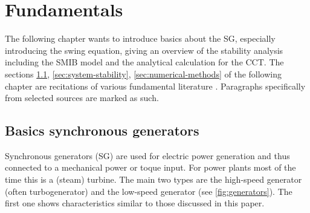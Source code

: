 
\chapter{Fundamentals}
\label{chap:fundamentals}

The following chapter wants to introduce basics about the \acs{SG}, especially introducing the swing equation, giving an overview of the stability analysis including the \acs{SMIB} model and the analytical calculation for the \acs{CCT}. The sections \ref{sec:basics-sg}, \ref{sec:system-stability}, \ref{sec:numerical-methods} of the following chapter are recitations of various fundamental literature \autocite{oedingElektrischeKraftwerkeUnd2016,schwabElektroenergiesystemeSmarteStromversorgung2022,georgievNumericalAnalysisTime2022,milesNumericalMethodsPython2023,langtangenPrimerScientificProgramming2016,machowskiPowerSystemDynamics2020,kundurPowerSystemStability2022}. Paragraphs specifically from selected sources are marked as such. 


\section{Basics synchronous generators}
\label{sec:basics-sg}

Synchronous generators (\acs{SG}) are used for electric power generation and thus connected to a mechanical power or toque input. For power plants most of the time this is a (steam) turbine. The main two types are the high-speed generator (often turbogenerator) and the low-speed generator (see \autoref{fig:generators}). The first one shows characteristics similar to those discussed in this paper. \autocite{machowskiPowerSystemDynamics2020,oedingElektrischeKraftwerkeUnd2016}

